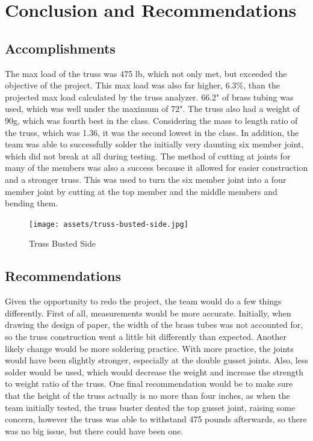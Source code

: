 \documentclass{article}
\let\Oldsection\section
\renewcommand{\section}{\FloatBarrier\Oldsection}
\let\Oldsubsection\subsection
\renewcommand{\subsection}{\FloatBarrier\Oldsubsection}
\begin{document}
\newpage

\section{Conclusion and Recommendations}

\subsection{Accomplishments}

The max load of the truss was 475 lb, which not only met, but exceeded the objective of the project. This max load was also far higher, 6.3\%, than the projected max load calculated by the truss analyzer. 66.2" of brass tubing was used, which was well under the maximum of 72". The truss also had a weight of 90g, which was fourth best in the class. Considering the mass to length ratio of the truss, which was 1.36, it was the second lowest in the class. In addition, the team was able to successfully solder the initially very daunting six member joint, which did not break at all during testing. The method of cutting at joints for many of the members was also a success because it allowed for easier construction and a stronger truss. This was used to turn the six member joint into a four member joint by cutting at the top member and the middle members and bending them.

\begin{figure}[!htb]
  \centering
  \texttt{[image: assets/truss-busted-side.jpg]}
  \label{fig:truss-busted-side}
  \caption{Truss Busted Side}
\end{figure}

\subsection{Recommendations}

Given the opportunity to redo the project, the team would do a few things differently. First of all, measurements would be more accurate. Initially, when drawing the design of paper, the width of the brass tubes was not accounted for, so the truss construction went a little bit differently than expected. Another likely change would be more soldering practice. With more practice, the joints would have been slightly stronger, especially at the double gusset joints. Also, less solder would be used, which would decrease the weight and increase the strength to weight ratio of the truss. One final recommendation would be to make sure that the height of the truss actually is no more than four inches, as when the team initially tested, the truss buster dented the top gusset joint, raising some concern, however the truss was able to withstand 475 pounds afterwards, so there was no big issue, but there could have been one.
\end{document}
